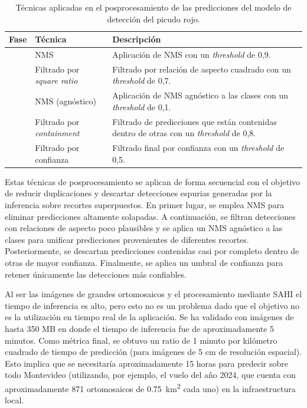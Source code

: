 \begin{table}[H]
    \centering
    \caption[Posprocesamiento de predicciones]{Técnicas aplicadas en el posprocesamiento de las predicciones del modelo de detección del picudo rojo.}
    \begin{tabularx}{\textwidth}{ >{\raggedright\arraybackslash}p{1 cm} >{\raggedright\arraybackslash}X >{\raggedright\arraybackslash}X }
        \toprule
        \textbf{Fase} & \textbf{Técnica}                   & \textbf{Descripción}                                                                            \\
        \midrule
        1             & NMS                                & Aplicación de NMS con un \textit{threshold} de 0,9.                                             \\
        2             & Filtrado por \textit{square ratio} & Filtrado por relación de aspecto cuadrado con un \textit{threshold} de 0,7.                     \\
        3             & NMS (agnóstico)                    & Aplicación de NMS agnóstico a las clases con un \textit{threshold} de 0,1.                      \\
        4             & Filtrado por \textit{containment}  & Filtrado de predicciones que están contenidas dentro de otras con un \textit{threshold} de 0,8. \\
        5             & Filtrado por confianza             & Filtrado final por confianza con un \textit{threshold} de 0,5.                                  \\
        \bottomrule
        \hline
    \end{tabularx}
    \label{tab:posprocesamiento-predicciones}
\end{table}

Estas técnicas de posprocesamiento se aplican de forma secuencial con el objetivo de reducir duplicaciones y descartar detecciones espurias generadas por la inferencia sobre recortes superpuestos. En primer lugar, se emplea NMS para eliminar predicciones altamente solapadas. A continuación, se filtran detecciones con relaciones de aspecto poco plausibles y se aplica un NMS agnóstico a las clases para unificar predicciones provenientes de diferentes recortes. Posteriormente, se descartan predicciones contenidas casi por completo dentro de otras de mayor confianza. Finalmente, se aplica un umbral de confianza para retener únicamente las detecciones más confiables.

Al ser las imágenes de grandes ortomosaicos y el procesamiento mediante SAHI el tiempo de inferencia es alto, pero esto no es un problema dado que el objetivo no es la utilización en tiempo real de la aplicación. Se ha validado con imágenes de hasta 350 MB en donde el tiempo de inferencia fue de aproximadamente 5 minutos. Como métrica final, se obtuvo un ratio de 1 minuto por kilómetro cuadrado de tiempo de predicción (para imágenes de 5 cm de resolución espacial). Esto implica que se necesitaría aproximadamente 15 horas para predecir sobre todo Montevideo (utilizando, por ejemplo, el vuelo del año 2024, que cuenta con aproximadamente 871 ortomosaicos de \SI{0,75}{km^2} cada uno) en la infraestructura local.

